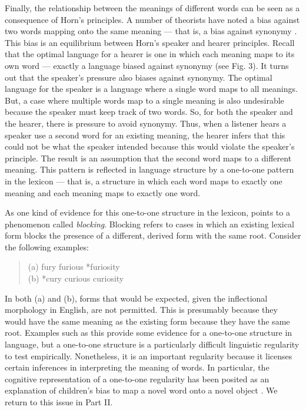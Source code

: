 \documentclass[man, noapacite, 12pt]{apa2}
\begin{document}
Finally, the relationship between the meanings of different words can be seen as a consequence of Horn's principles. A number of theorists have noted a bias against two words mapping onto the same meaning --- that is, a bias against synonymy \cite{saussure, kiparsky1983word, horn1984, clark1987principle, clark1988logic}. This bias is an equilibrium between Horn's speaker and hearer principles. Recall that the optimal language for a hearer is one in which each meaning maps to its own word --- exactly a language biased against synonymy (see Fig. 3). It turns out that the speaker's pressure also biases against synonymy.  The optimal language for the speaker is a language where a single word maps to all meanings. But, a case where multiple words map to a single meaning is also undesirable because the speaker must keep track of two words. So, for both the speaker and the hearer, there is pressure to avoid synonymy. Thus, when a listener hears a speaker use a second word for an existing meaning, the hearer infers that this could not be what the speaker intended because this would violate the speaker's principle. The result is an assumption that the second word maps to a different meaning. This pattern is reflected in language structure by a one-to-one pattern in the lexicon --- that is, a structure in which each word maps to exactly one meaning and each meaning maps to exactly one word.

As one kind of evidence for this one-to-one structure in the lexicon,  points to a phenomenon called {\it blocking}. Blocking refers to cases in which an existing lexical form blocks the presence of a different, derived form with the same root. Consider the following examples:
 \begin{quote} 
 	(a) fury furious *furiosity\\
	(b) *cury curious curiosity 
\end{quote}
In both (a) and (b), forms that would be expected, given the inflectional morphology in English, are not permitted. This is presumably because they would have the same meaning as the existing form because they have the same root. Examples such as this provide some evidence for a one-to-one structure in language, but a one-to-one structure is a particularly difficult linguistic regularity to test empirically. Nonetheless, it is an important regularity because it licenses certain inferences in interpreting the meaning of words. In particular, the cognitive representation of a one-to-one regularity has been posited as an explanation of children's bias to map a novel word onto a novel object \cite{markman1988, markman2003}. We return to this issue in Part II.
\end{document}

